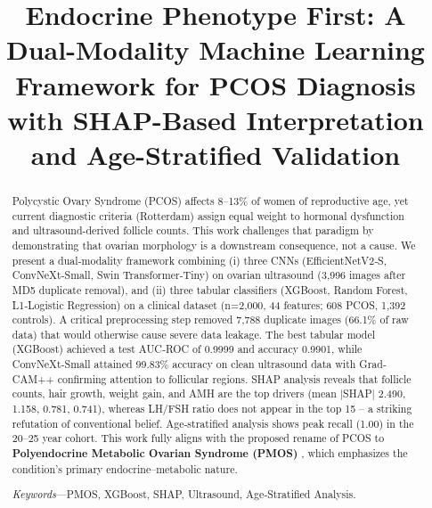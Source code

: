 \documentclass[conference]{IEEEtran}
\begin{document}
\title{Endocrine Phenotype First: A Dual-Modality Machine Learning Framework for PCOS Diagnosis with SHAP-Based Interpretation and Age-Stratified Validation}

\author{
}

\maketitle

\begin{abstract}
Polycystic Ovary Syndrome (PCOS) affects 8–13\% of women of reproductive age, yet current diagnostic criteria (Rotterdam) assign equal weight to hormonal dysfunction and ultrasound-derived follicle counts. This work challenges that paradigm by demonstrating that ovarian morphology is a downstream consequence, not a cause. We present a dual‑modality framework combining (i) three CNNs (EfficientNetV2‑S, ConvNeXt‑Small, Swin Transformer‑Tiny) on ovarian ultrasound (3,996 images after MD5 duplicate removal), and (ii) three tabular classifiers (XGBoost, Random Forest, L1‑Logistic Regression) on a clinical dataset (n=2,000, 44 features; 608 PCOS, 1,392 controls). A critical preprocessing step removed 7,788 duplicate images (66.1\% of raw data) that would otherwise cause severe data leakage. The best tabular model (XGBoost) achieved a test AUC‑ROC of 0.9999 and accuracy 0.9901, while ConvNeXt‑Small attained 99.83\% accuracy on clean ultrasound data with Grad-CAM++ confirming attention to follicular regions. SHAP analysis reveals that follicle counts, hair growth, weight gain, and AMH are the top drivers (mean |SHAP| 2.490, 1.158, 0.781, 0.741), whereas LH/FSH ratio does not appear in the top 15 – a striking refutation of conventional belief. Age‑stratified analysis shows peak recall (1.00) in the 20–25 year cohort. This work fully aligns with the proposed rename of PCOS to \textbf{Polyendocrine Metabolic Ovarian Syndrome (PMOS)} , which emphasizes the condition's primary endocrine–metabolic nature.

\smallskip
\textit{Keywords}—PMOS, XGBoost, SHAP, Ultrasound, Age‑Stratified Analysis.
\end{abstract}
\end{document}
